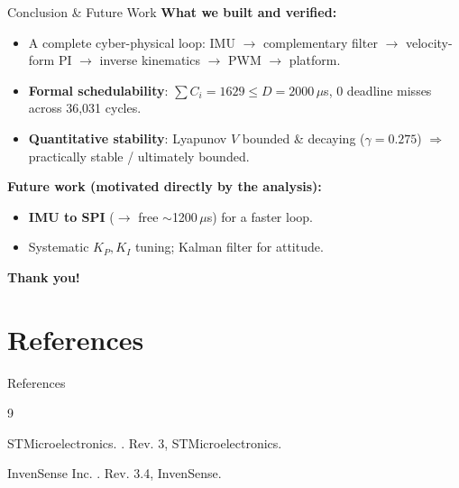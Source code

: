 \documentclass[10pt]{beamer}
\begin{document}
\begin{frame}{Conclusion \& Future Work}
  \textbf{What we built and verified:}
  \begin{itemize}
    \item A complete cyber-physical loop: IMU $\to$ complementary filter $\to$
          velocity-form PI $\to$ inverse kinematics $\to$ PWM $\to$ platform.
    \item \textbf{Formal schedulability}: $\sum C_i = 1629 \le D = 2000\,\mu$s,
          0 deadline misses across 36{,}031 cycles.
    \item \textbf{Quantitative stability}: Lyapunov $V$ bounded \& decaying
          ($\gamma{=}0.275$) $\Rightarrow$ practically stable / ultimately bounded.
  \end{itemize}
 
  \vspace{0.3em}
  \textbf{Future work (motivated directly by the analysis):}
  \begin{itemize}
    \item \textbf{IMU to SPI} ($\to$ free $\sim$1200\,$\mu$s) for a faster loop.
    \item Systematic $K_P,K_I$ tuning; Kalman filter for attitude.
  \end{itemize}
 
  \vspace{0.4em}
  \begin{center}
  \large\textbf{Thank you!}
  \end{center}
\end{frame}


\section{References}
\begin{frame}[allowframebreaks]{References}
  \footnotesize
  \begin{thebibliography}{9}
    
    STMicroelectronics.
    .
    \newblock Rev. 3, STMicroelectronics.

    \vspace{0.3cm} %

    InvenSense Inc.
    .
    \newblock Rev. 3.4, InvenSense.

  \end{thebibliography}
\end{frame}
\end{document}
